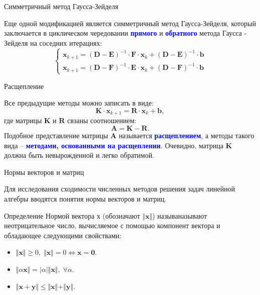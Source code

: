 \documentclass[10pt,xcolor=pst,aspectratio=169]{beamer}
\begin{document}
\begin{frame}{Симметричный
метод Гаусса-Зейделя}

	\transdissolve[duration=0.2]
	\justifying
	\large
	Еще одной модификацией является симметричный метод Гаусса-Зейделя, который заключается в циклическом чередовании \textbf{\textcolor{blue}{прямого}} и \textbf{\textcolor{blue}{обратного}} метода Гаусса - Зейделя на соседних итерациях:
	\[
		\begin{cases}
			\textbf{x}_{k+1} = (\textbf{D} - \textbf{E})^{-1} \cdot \textbf{F} \cdot \textbf{x}_{k} + (\textbf{D} - \textbf{E})^{-1} \cdot \textbf{b} \\
			\textbf{x}_{k+1} = (\textbf{D} - \textbf{F})^{-1} \cdot \textbf{E} \cdot \textbf{x}_{k} + (\textbf{D} - \textbf{F})^{-1} \cdot \textbf{b}
		\end{cases}
	\]

\end{frame}

\begin{frame}{Расщепление}

	\transdissolve[duration=0.2]
	\justifying
	\large
	Все предыдущие методы можно записать в виде:
	\[
		\textbf{K} \cdot \textbf{x}_{k+1} = \textbf{R} \cdot \textbf{x}_{k} + \textbf{b},
	\]
	где матрицы $\textbf{K}$ и $\textbf{R}$ свзаны соотношением:
	\[
		\textbf{A} = \textbf{K} - \textbf{R}.
	\]
	Подобное представление матрицы $\textbf{A}$ называется \textbf{\textcolor{blue}{расщеплением}}, а методы такого вида -- \textbf{\textcolor{blue}{методами, основанными на расщеплении}}. Очевидно, матрица $\textbf{K}$ должна быть невырожденной и легко обратимой.

\end{frame}

\begin{frame}{Нормы векторов и матриц}

	\transdissolve[duration=0.2]
	\justifying
	\large
	Для исследования сходимости численных методов решения задач линейной алгебры вводятся понятия нормы векторов и матриц.
	\begin{block}{Определение}
		\justifying
		Нормой вектора $\textbf{х}$ (обозначают $\Vert \textbf{x} \Vert$) называназывают неотрицательное число, вычисляемое с помощью компонент вектора и обладающее следующими свойствами:
		\begin{itemize}
			\item $\Vert \textbf{x} \Vert \geq 0, \; \Vert \textbf{x} \Vert = 0 \Leftrightarrow \textbf{x} = \textbf{0}$.
			\item $\Vert \alpha \textbf{x} \Vert = \vert \alpha \vert \Vert \textbf{x} \Vert , \; \forall \alpha$.
			\item $\Vert \textbf{x} + \textbf{y} \Vert \leq \Vert \textbf{x} \Vert + \Vert \textbf{y} \Vert$.
		\end{itemize}
	\end{block}

\end{frame}
\end{document}
